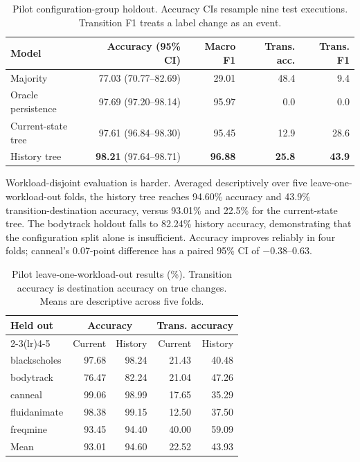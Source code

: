 \documentclass{article}
\begin{document}
\begin{table}[t]
  \caption{Pilot configuration-group holdout. Accuracy CIs resample nine test
  executions. Transition F1 treats a label change as an event.}
  \label{tab:pilot}
  \centering
  \small
  \setlength{\tabcolsep}{4pt}
  \begin{tabular}{lrrrr}
    \toprule
    Model & Accuracy (95\% CI) & Macro F1 & Trans. acc. & Trans. F1 \\
    \midrule
    Majority & 77.03 (70.77--82.69) & 29.01 & 48.4 & 9.4 \\
    Oracle persistence & 97.69 (97.20--98.14) & 95.97 & 0.0 & 0.0 \\
    Current-state tree & 97.61 (96.84--98.30) & 95.45 & 12.9 & 28.6 \\
    History tree & \textbf{98.21} (97.64--98.71) & \textbf{96.88} & \textbf{25.8} & \textbf{43.9} \\
    \bottomrule
  \end{tabular}
\end{table}

Workload-disjoint evaluation is harder. Averaged descriptively over five
leave-one-workload-out folds, the history tree reaches 94.60\% accuracy and 43.9\%
transition-destination accuracy, versus 93.01\% and 22.5\% for the current-state tree.
The bodytrack holdout falls to 82.24\% history accuracy, demonstrating that the
configuration split alone is insufficient. Accuracy improves reliably in four folds;
canneal's 0.07-point difference has a paired 95\% CI of $-0.38$--0.63.

\begin{table}[t]
  \caption{Pilot leave-one-workload-out results (\%). Transition accuracy is
  destination accuracy on true changes. Means are descriptive across five folds.}
  \label{tab:loo}
  \centering
  \small
  \setlength{\tabcolsep}{4pt}
  \begin{tabular}{lrrrr}
    \toprule
    Held out & \multicolumn{2}{c}{Accuracy} & \multicolumn{2}{c}{Trans. accuracy} \\
    \cmidrule(lr){2-3}\cmidrule(lr){4-5}
    & Current & History & Current & History \\
    \midrule
    blackscholes & 97.68 & 98.24 & 21.43 & 40.48 \\
    bodytrack    & 76.47 & 82.24 & 21.04 & 47.26 \\
    canneal      & 99.06 & 98.99 & 17.65 & 35.29 \\
    fluidanimate & 98.38 & 99.15 & 12.50 & 37.50 \\
    freqmine     & 93.45 & 94.40 & 40.00 & 59.09 \\
    \midrule
    Mean         & 93.01 & 94.60 & 22.52 & 43.93 \\
    \bottomrule
  \end{tabular}
\end{table}
\end{document}

